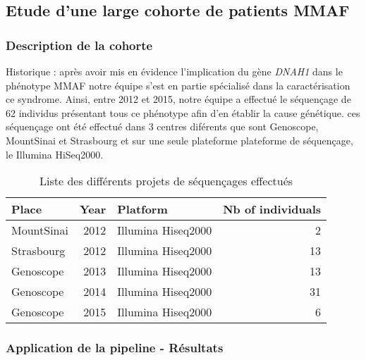 \documentclass[12pt,twoside]{reedthesis}
\theoremstyle{definition}
\theoremstyle{definition}
\theoremstyle{remark}
\begin{document}
  \newpage
  
  \subsection{Etude d'une large cohorte de patients
  MMAF}\label{cohortemmah}
  
  \subsubsection{Description de la
  cohorte}\label{description-de-la-cohorte}
  
  Historique : après avoir mis en évidence l'implication du gène
  \emph{DNAH1} dans le phénotype MMAF notre équipe s'est en partie
  spécialisé dans la caractérisation ce syndrome. Ainsi, entre 2012 et
  2015, notre équipe a effectué le séquençage de 62 individus présentant
  tous ce phénotype afin d'en établir la cause génétique. ces séquençage
  ont été effectué dans 3 centres diférents que sont Genoscope, MountSinai
  et Strasbourg et sur une seule plateforme plateforme de séquençage, le
  Illumina HiSeq2000.
  
  \begin{longtable}[t]{lrlr}
  \caption{\label{tab:tabcohort}Liste des différents projets de séquençages effectués}\\
  \toprule
  Place & Year & Platform & Nb of individuals\\
  \midrule
  MountSinai & 2012 & Illumina Hiseq2000 & 2\\
  Strasbourg & 2012 & Illumina Hiseq2000 & 13\\
  Genoscope & 2013 & Illumina Hiseq2000 & 13\\
  Genoscope & 2014 & Illumina Hiseq2000 & 31\\
  Genoscope & 2015 & Illumina Hiseq2000 & 6\\
  \bottomrule
  \end{longtable}
  
  \newpage
  
  \subsubsection{Application de la pipeline -
  Résultats}\label{application-de-la-pipeline---resultats}
  
\end{document}
